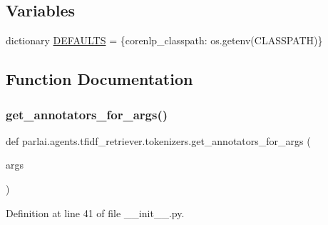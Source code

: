 \subsection*{Variables}
\begin{DoxyCompactItemize}
\item 
dictionary \hyperlink{namespaceparlai_1_1agents_1_1tfidf__retriever_1_1tokenizers_aceb8da08449faf55b676b50a2c09a291}{D\+E\+F\+A\+U\+L\+TS} = \{\textquotesingle{}corenlp\+\_\+classpath\textquotesingle{}\+: os.\+getenv(\textquotesingle{}C\+L\+A\+S\+S\+P\+A\+TH\textquotesingle{})\}
\end{DoxyCompactItemize}


\subsection{Function Documentation}
\mbox{\label{namespaceparlai_1_1agents_1_1tfidf__retriever_1_1tokenizers_abbf344e2c42997de73bbe499f86cdba7}} 
\subsubsection{\texorpdfstring{get\+\_\+annotators\+\_\+for\+\_\+args()}{get\_annotators\_for\_args()}}
{\footnotesize\ttfamily def parlai.\+agents.\+tfidf\+\_\+retriever.\+tokenizers.\+get\+\_\+annotators\+\_\+for\+\_\+args (\begin{DoxyParamCaption}\item[{}]{args }\end{DoxyParamCaption})}



Definition at line 41 of file \+\_\+\+\_\+init\+\_\+\+\_\+.\+py.



